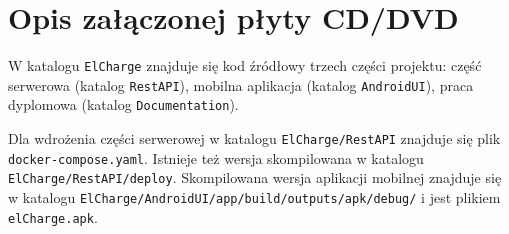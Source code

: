 \chapter{Opis załączonej płyty CD/DVD}
W katalogu \texttt{ElCharge} znajduje się kod źródłowy trzech części projektu: część serwerowa (katalog \texttt{RestAPI}), mobilna aplikacja (katalog \texttt{AndroidUI}), praca dyplomowa (katalog \texttt{Documentation}).

Dla wdrożenia części serwerowej w katalogu \texttt{ElCharge/RestAPI} znajduje się plik \texttt{docker-compose.yaml}. Istnieje też wersja skompilowana w katalogu \texttt{ElCharge/RestAPI/deploy}.
Skompilowana wersja aplikacji mobilnej znajduje się w katalogu \texttt{ElCharge/AndroidUI/app/build/outputs/apk/debug/} i jest plikiem \texttt{elCharge.apk}.